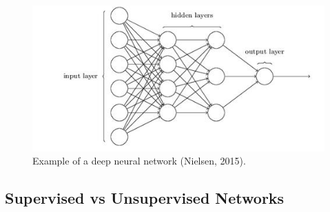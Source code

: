 \documentclass[12pt,twoside]{report}
\begin{document}
		
\begin{figure}[tb]
\centering
\includegraphics[width = 0.8\hsize]{./figures/neuralnet}
\caption{Example of a deep neural network (Nielsen, 2015).}
\label{fig:neuralnet}
\end{figure}



		\subsection{Supervised vs Unsupervised Networks}
\end{document}
